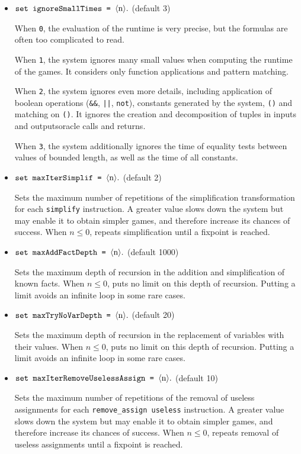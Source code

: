 \begin{itemize}
\begin{itemize}
\item $\texttt{set ignoreSmallTimes = }\langle\textrm{n}\rangle{\tt .}$ (default 3)

When {\tt 0}, the evaluation of the runtime is very precise,
but the formulas are often too complicated to read.

When {\tt 1}, the system ignores many small values when computing
the runtime of the games. It considers only function applications
and pattern matching.

When {\tt 2}, the system ignores even more details, including
application of boolean operations (\texttt{\&\&},
\texttt{\string|\string|}, \texttt{not}), constants generated by the
system, \texttt{()} and matching on \texttt{()}. It ignores the
creation and decomposition of tuples in \ifchannels
inputs and outputs\else oracle calls and returns\fi.

When {\tt 3}, the system additionally ignores the time of equality
tests between values of bounded length, as well as the time of
all constants.

\item $\texttt{set maxIterSimplif = }\langle\textrm{n}\rangle{\tt .}$ (default 2)

Sets the maximum number of repetitions of the simplification transformation
for each {\tt simplify} instruction.
A greater value slows down the system but may enable it to obtain
simpler games, and therefore increase its chances of success.
When $n \leq 0$, repeats simplification until a fixpoint is reached.

\item $\texttt{set maxAddFactDepth = }\langle\textrm{n}\rangle{\tt .}$ (default 1000)

Sets the maximum depth of recursion in the addition and simplification
of known facts. 
When $n \leq 0$, puts no limit on this depth of recursion.
Putting a limit avoids an infinite loop in some rare cases.

\item $\texttt{set maxTryNoVarDepth = }\langle\textrm{n}\rangle{\tt .}$ (default 20)

Sets the maximum depth of recursion in the replacement of
variables with their values.
When $n \leq 0$, puts no limit on this depth of recursion.
Putting a limit avoids an infinite loop in some rare cases.

\item $\texttt{set maxIterRemoveUselessAssign = }\langle\textrm{n}\rangle{\tt .}$ (default 10)

Sets the maximum number of repetitions of the removal of useless assignments 
for each {\tt remove\string_assign useless} instruction.
A greater value slows down the system but may enable it to obtain
simpler games, and therefore increase its chances of success.
When $n \leq 0$, repeats removal of useless assignments until a fixpoint 
is reached.


\end{itemize}
\end{itemize}
